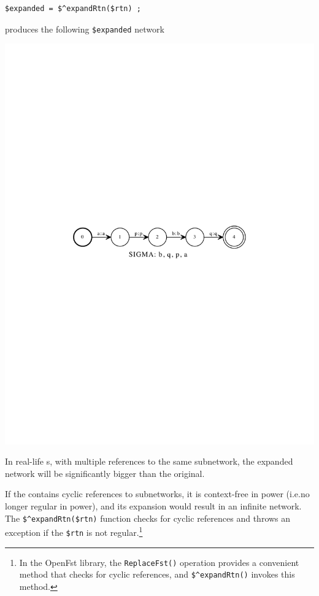 \begin{Verbatim}[fontsize=\small]
$expanded = $^expandRtn($rtn) ;
\end{Verbatim}

\noindent
produces the following \verb!$expanded! network

\begin{center}
\includegraphics[width=\textwidth]{images/expanded.pdf}
\end{center}

\noindent
In real-life s, with multiple references to the same
subnetwork, the expanded network will be significantly bigger than the
original.  

If the  contains cyclic references to subnetworks, it is
context-free in power (i.e.\@ no longer regular in power), and its
expansion would result in an infinite network.  The
\verb!$^expandRtn($rtn)! function checks for cyclic references and throws
an exception if the \verb!$rtn! is not regular.\footnote{In the OpenFst
library, the \verb!ReplaceFst()! operation provides a convenient method
that checks for cyclic references, and \verb!$^expandRtn()! invokes this
method.}



